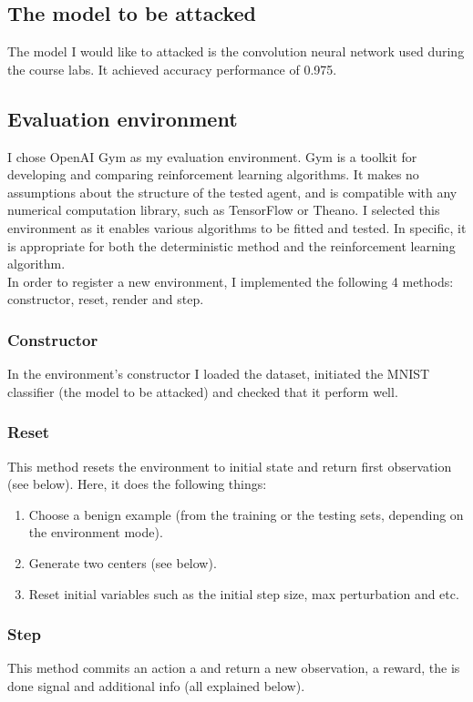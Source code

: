\documentclass{article}
\begin{document}
\subsection{The model to be attacked}
The model I would like to attacked is the convolution neural network used during the course labs. It achieved accuracy performance of 0.975.

\subsection{Evaluation environment}
I chose OpenAI Gym \cite{brockman2016openai} as my evaluation environment. Gym is a toolkit for developing and comparing reinforcement learning algorithms. It makes no assumptions about the structure of the tested agent, and is compatible with any numerical computation library, such as TensorFlow or Theano.
I selected this environment as it enables various algorithms to be fitted and tested. In specific, it is appropriate for both the deterministic method and the reinforcement learning algorithm. \\
In order to register a new environment, I implemented the following 4 methods: constructor, reset, render and step.
\subsubsection{Constructor}
In the environment's constructor I loaded the dataset, initiated the MNIST classifier (the model to be attacked) and checked that it perform well.

\subsubsection{Reset}
This method resets the environment to initial state and return first observation (see below).
Here, it does the following things:
\begin{enumerate}
\item Choose a benign example (from the training or the testing sets, depending on the environment mode).
\item Generate two centers (see below).
\item Reset initial variables such as the initial step size, max perturbation and etc.
\end{enumerate}

\subsubsection{Step}
This method commits an action a and return a new observation,  a reward, the is done signal and additional info (all explained below).
\end{document}
